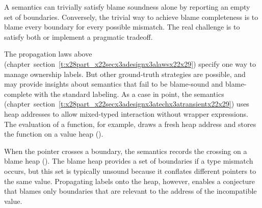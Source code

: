 \documentclass[ twoside,open=right,titlepage,numbers=noenddot,headinclude,%
                footinclude=true,cleardoublepage=empty,abstract=off,
                BCOR=5mm,paper=a4,fontsize=11pt,%
                ngerman,american,%
                parts,pdfspacing]{scrreprt}
\newcommand{\SecRef}[2]{section~#1}
\newcommand{\SecRefLocal}[3]{\hyperref[#1]{\SecRef{#2}{#3}}}
\renewcommand{\SecRefLocal}[3]{section~\ref{#1}}
\begin{document}
A semantics can trivially satisfy blame soundness alone by reporting an empty
 set of boundaries.
Conversely, the trivial way to achieve blame completeness is to blame
 every boundary for every possible mismatch.
The real challenge is to satisfy both or implement a pragmatic tradeoff.



The propagation laws above (chapter~\SecRefLocal{t:x28part_x22secx3adesignx3alawsx22x29}{4.4.4.1}{How to lift a reduction relation}) specify one way
 to manage ownership labels.
But other ground{-}truth strategies are possible,
 and may provide insights about semantics that fail to be blame{-}sound and
 blame{-}complete with the standard labeling.
As a case in point, the \relax{\tname} semantics (chapter~\SecRefLocal{t:x28part_x22secx3adesignx3atechx3atransientx22x29}{4.5.8}{\relax{\tname} and its Properties}) uses heap addresses
 to allow mixed{-}typed interaction without wrapper expressions.
The evaluation of a function, for example, draws a fresh heap address 
 and stores the function on a value heap (\relax{$\vstore$}).


\noindent{}When the pointer  crosses a boundary,
 the semantics records the crossing on a blame heap (\relax{$\bstore$}).
The blame heap provides a set of boundaries if a type mismatch occurs,
 but this set is typically unsound because it conflates different
 pointers to the same value.
Propagating labels onto the heap, however, enables a conjecture
 that \relax{\tname} blames only boundaries that are relevant to the address of the
 incompatible value.
\end{document}

